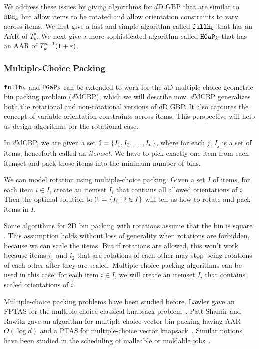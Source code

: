 We address these issues by giving algorithms for $d$D GBP
that are similar to $\operatorname{\mathtt{HDH}}_{k}$ but allow items to be rotated
and allow orientation constraints to vary across items.
We first give a fast and simple algorithm called $\operatorname{\mathtt{fullh}}_k$ that has an AAR of $T_k^d$.
We next give a more sophisticated algorithm called $\operatorname{\mathtt{HGaP}}_k$
that has an AAR of $T_k^{d-1}(1+\varepsilon)$.

\subsubsection{Multiple-Choice Packing}

$\operatorname{\mathtt{fullh}}_k$ and $\operatorname{\mathtt{HGaP}}_k$ can be extended to work for the $d$D multiple-choice
geometric bin packing problem ($d$MCBP), which we will describe now.
$d$MCBP generalizes both the rotational and non-rotational versions of $d$D GBP.
It also captures the concept of variable orientation constraints across items.
This perspective will help us design algorithms for the rotational case.

In $d$MCBP, we are given a set $\mathcal{I} = \{I_1, I_2, \ldots, I_n\}$,
where for each $j$, $I_j$ is a set of items, henceforth called an {\em itemset}.
We have to pick exactly one item from each itemset and pack those items
into the minimum number of bins.

We can model rotation using multiple-choice packing:
Given a set $I$ of items, for each item $i \in I$,
create an itemset $I_i$ that contains all allowed orientations of $i$.
Then the optimal solution to $\mathcal{I} := \{I_i: i \in I\}$
will tell us how to rotate and pack items in $I$.

Some algorithms for 2D bin packing with rotations assume that
the bin is square \cite{rna,JansenP2013,bansal2014binpacking}.
This assumption holds without loss of generality when rotations are forbidden,
because we can scale the items.
But if rotations are allowed, this won't work because
items $i_1$ and $i_2$ that are rotations of each other
may stop being rotations of each other after they are scaled.
Multiple-choice packing algorithms can be used in this case:
for each item $i \in I$, we will create an itemset $I_i$ that
contains scaled orientations of $i$.

Multiple-choice packing problems have been studied before.
Lawler gave an FPTAS for the multiple-choice classical knapsack problem~\cite{lawler1979fast}.
Patt-Shamir and Rawitz gave an algorithm for multiple-choice vector bin packing having
AAR $O(\log d)$ and a PTAS for multiple-choice vector knapsack~\cite{patt2012vector}.
Similar notions have been studied in the scheduling of
malleable or moldable jobs~\cite{ZhangJ07,Jansen12}.


